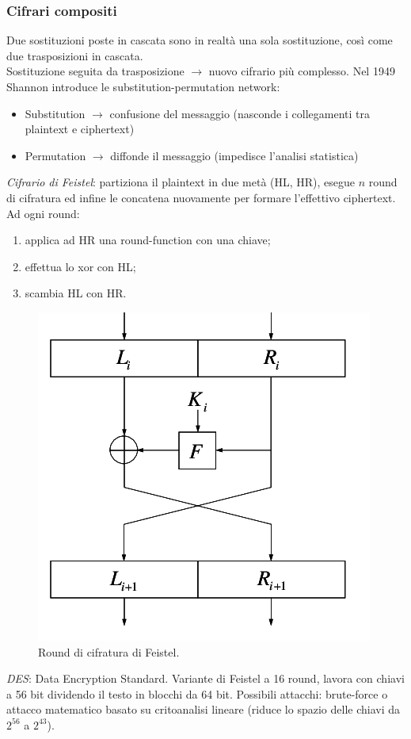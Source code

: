 \documentclass[a4paper, 11pt, twoside, openright, fleqn]{report}
\begin{document}
\subsubsection{Cifrari compositi}
Due sostituzioni poste in cascata sono in realtà una sola sostituzione, così come due trasposizioni in cascata.\\
Sostituzione seguita da trasposizione $\rightarrow$ nuovo cifrario più complesso.
Nel 1949 Shannon introduce le substitution-permutation network:
\begin{itemize}
	\item Substitution $\rightarrow$ confusione del messaggio (nasconde i collegamenti tra plaintext e ciphertext)
	\item Permutation $\rightarrow$ diffonde il messaggio (impedisce l'analisi statistica)
\end{itemize}
\emph{Cifrario di Feistel}: partiziona il plaintext in due metà (HL, HR), esegue $n$ round di cifratura ed infine le concatena nuovamente per formare l'effettivo ciphertext. Ad ogni round:
\begin{enumerate}
	\item applica ad HR una round-function con una chiave;
	\item effettua lo xor con HL;
	\item scambia HL con HR.
\end{enumerate}
\begin{figure}[htp]
	\centering
	\includegraphics[width=.45\textwidth]{images/Feistel}
	\caption{Round di cifratura di Feistel.}
\end{figure}
\emph{DES}: Data Encryption Standard. Variante di Feistel a 16 round, lavora con chiavi a 56 bit dividendo il testo in blocchi da 64 bit. Possibili attacchi: brute-force o attacco matematico basato su critoanalisi lineare (riduce lo spazio delle chiavi da $2^{56}$ a $2^{43}$).
\end{document}
